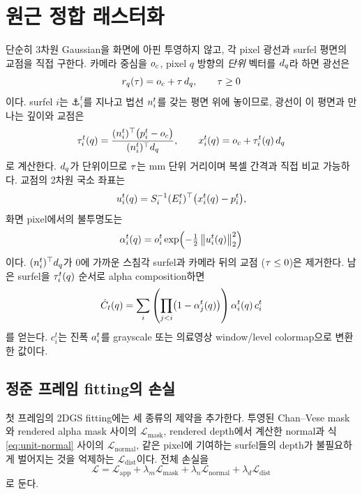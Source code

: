 \section{원근 정합 래스터화}
\label{sec:raster}

단순히 3차원 Gaussian을 화면에 아핀 투영하지 않고, 각 pixel 광선과 surfel 평면의
교점을 직접 구한다. 카메라 중심을 $o_c$, pixel $q$ 방향의 \emph{단위} 벡터를
$d_q$라 하면 광선은
\begin{equation}
  r_q(\tau) = o_c + \tau\,d_q, \qquad \tau \ge 0
  \label{eq:ray}
\end{equation}
이다. surfel $i$는 $\anchor^t_i$를 지나고 법선 $n^t_i$를 갖는 평면 위에 놓이므로,
광선이 이 평면과 만나는 깊이와 교점은
\begin{equation}
  \tau^t_i(q) = \frac{(n^t_i)^{\top}\bigl(p^t_i - o_c\bigr)}
                        {(n^t_i)^{\top} d_q},
  \qquad
  x^t_i(q) = o_c + \tau^t_i(q)\,d_q
  \label{eq:ray-plane}
\end{equation}
로 계산한다. $d_q$가 단위이므로 $\tau$는 mm 단위 거리이며 복셀 간격과 직접
비교 가능하다. 교점의 2차원 국소 좌표는
\begin{equation}
  u^t_i(q) = S_i^{-1}(E^t_i)^{\top}\bigl(x^t_i(q) - p^t_i\bigr),
  \label{eq:local-coord}
\end{equation}
화면 pixel에서의 불투명도는
\begin{equation}
  \alpha^t_i(q) = o^t_i \exp\!\left(-\tfrac{1}{2}\left\lVert u^t_i(q) \right\rVert^2_2\right)
  \label{eq:alpha}
\end{equation}
이다. $(n^t_i)^{\top}d_q$가 0에 가까운 스침각 surfel과 카메라 뒤의 교점
($\tau \le 0$)은 제거한다. 남은 surfel을 $\tau^t_i(q)$ 순서로 alpha
composition하면
\begin{equation}
  \hat{C}_t(q) = \sum_i \left(\prod_{j<i}\bigl(1-\alpha^t_j(q)\bigr)\right)
               \alpha^t_i(q)\,c^t_i
  \label{eq:compositing}
\end{equation}
를 얻는다. $c^t_i$는 진폭 $a^t_i$를 grayscale 또는 의료영상 window/level colormap으로
변환한 값이다.

\subsection{정준 프레임 fitting의 손실}

첫 프레임의 2DGS fitting에는 세 종류의 제약을 추가한다. 투영된 Chan--Vese mask와
rendered alpha mask 사이의 $\mathcal{L}_{\mathrm{mask}}$, rendered depth에서 계산한
normal과 식 \eqref{eq:unit-normal} 사이의 $\mathcal{L}_{\mathrm{normal}}$, 같은 pixel에
기여하는 surfel들의 depth가 불필요하게 벌어지는 것을 억제하는
$\mathcal{L}_{\mathrm{dist}}$이다. 전체 손실을
\begin{equation}
  \mathcal{L} = \mathcal{L}_{\mathrm{app}}
  + \lambda_m \mathcal{L}_{\mathrm{mask}}
  + \lambda_n \mathcal{L}_{\mathrm{normal}}
  + \lambda_d \mathcal{L}_{\mathrm{dist}}
  \label{eq:total-loss}
\end{equation}
로 둔다.

